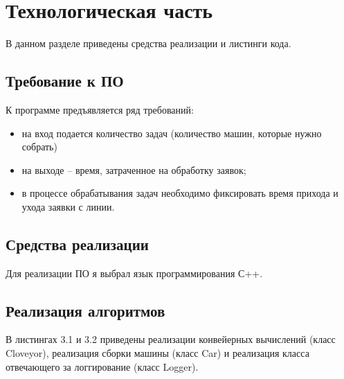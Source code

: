 \documentclass[12pt]{report}
\begin{document}
\chapter{Технологическая часть}

В данном разделе приведены средства реализации и листинги кода.

\section{Требование к ПО}

К программе предъявляется ряд требований:

\begin{itemize}
	\item на вход подается количество задач (количество машин, которые нужно собрать)
	\item на выходе -- время, затраченное на обработку заявок;
	\item в процессе обрабатывания задач необходимо фиксировать время прихода и ухода заявки с линии.
\end{itemize}

\section{Средства реализации}

Для реализации ПО я выбрал язык программирования С++.

\section{Реализация алгоритмов}

В листингах 3.1 и 3.2 приведены реализации конвейерных вычислений (класс Cloveyor), реализация сборки машины (класс Car) и реализация класса отвечающего за логгирование (класс Logger).
\end{document}
